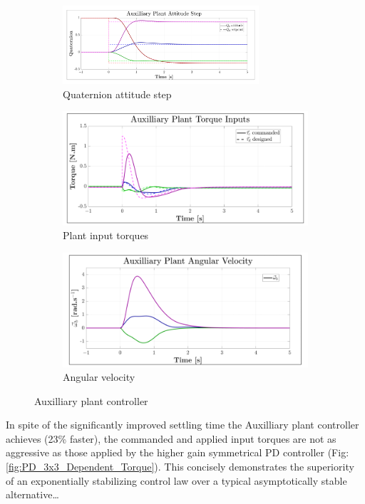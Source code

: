 \begin{figure}[hbtp]
\vspace{-8pt}
\centering
\begin{subfigure}{\textwidth}
\centering
\includegraphics[width=0.8\textwidth]{graphs/XPD_Step}
\vspace{-8pt}
\caption{Quaternion attitude step}
\label{fig:XPD_Step}
\end{subfigure}
\begin{subfigure}{0.49\textwidth}
\centering
\includegraphics[width=\textwidth]{graphs/XPD_Torque}
\vspace{-12pt}
\caption{Plant input torques}
\label{fig:XPD_Torque}
\end{subfigure}
\begin{subfigure}{0.49\textwidth}
\centering
\includegraphics[width=\textwidth]{graphs/XPD_Angular}
\vspace{-12pt}
\caption{Angular velocity}
\label{fig:XPD_Angular}
\end{subfigure}
\vspace{-6pt}
\caption{Auxilliary plant controller}
\vspace{-4pt}
\end{figure}
In spite of the significantly improved settling time the Auxilliary plant controller achieves (23\% faster), the commanded and applied input torques are not as aggressive as those applied by the higher gain symmetrical PD controller (Fig:\ref{fig:PD_3x3_Dependent_Torque}). This concisely demonstrates the superiority of an exponentially stabilizing control law over a typical asymptotically stable alternative\ldots
